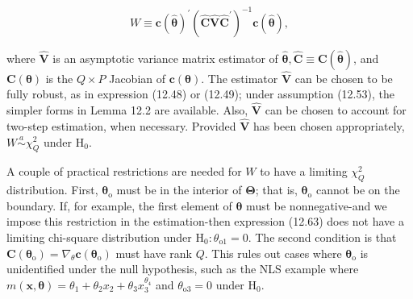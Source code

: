 \documentclass[10pt]{article}
\begin{document}
\begin{equation*}
W \equiv \mathbf{c}(\hat{\boldsymbol{\theta}})^{\prime}\left(\hat{\mathbf{C}} \hat{\mathbf{V}} \hat{\mathbf{C}}^{\prime}\right)^{-1} \mathbf{c}(\hat{\boldsymbol{\theta}}), \tag{12.63}
\end{equation*}


where $\hat{\mathbf{V}}$ is an asymptotic variance matrix estimator of $\hat{\boldsymbol{\theta}}, \hat{\mathbf{C}} \equiv \mathbf{C}(\hat{\boldsymbol{\theta}})$, and $\mathbf{C}(\boldsymbol{\theta})$ is the $Q \times P$ Jacobian of $\mathbf{c}(\boldsymbol{\theta})$. The estimator $\hat{\mathbf{V}}$ can be chosen to be fully robust, as in expression (12.48) or (12.49); under assumption (12.53), the simpler forms in Lemma 12.2 are available. Also, $\hat{\mathbf{V}}$ can be chosen to account for two-step estimation, when necessary. Provided $\hat{\mathbf{V}}$ has been chosen appropriately, $W \stackrel{a}{\sim} \chi_{Q}^{2}$ under $\mathrm{H}_{0}$.

A couple of practical restrictions are needed for $W$ to have a limiting $\chi_{Q}^{2}$ distribution. First, $\boldsymbol{\theta}_{\mathrm{o}}$ must be in the interior of $\boldsymbol{\Theta}$; that is, $\boldsymbol{\theta}_{\mathrm{o}}$ cannot be on the boundary. If, for example, the first element of $\boldsymbol{\theta}$ must be nonnegative-and we impose this restriction in the estimation-then expression (12.63) does not have a limiting chi-square distribution under $\mathrm{H}_{0}: \theta_{\mathrm{o} 1}=0$. The second condition is that $\mathbf{C}\left(\boldsymbol{\theta}_{\mathrm{o}}\right)=\nabla_{\theta} \mathbf{c}\left(\boldsymbol{\theta}_{\mathrm{o}}\right)$ must have rank $Q$. This rules out cases where $\boldsymbol{\theta}_{\mathrm{o}}$ is unidentified under the null hypothesis, such as the NLS example where $m(\mathbf{x}, \boldsymbol{\theta})=\theta_{1}+\theta_{2} x_{2}+\theta_{3} x_{3}^{\theta_{4}}$ and $\theta_{\mathrm{o} 3}=0$ under $\mathrm{H}_{0}$.
\end{document}

